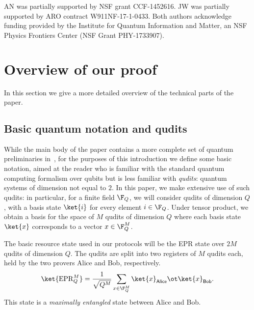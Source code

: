 \documentclass[11pt]{article}
\newcommand{\epr}{\mathrm{EPR}}
\newcommand{\reg}[1]{{\mathsf{#1}}}
\begin{document}
AN was partially supported by NSF grant CCF-1452616.  JW was partially
supported by ARO contract W911NF-17-1-0433. Both authors acknowledge funding provided by the Institute for Quantum Information and Matter, an NSF Physics Frontiers Center (NSF Grant PHY-1733907).




\section{Overview of our proof}  \label{sec:overview}

In this section we give a more detailed overview of the technical
parts of the paper.

\subsection{Basic quantum notation and qudits}
While the main body of the paper contains a more complete set of
quantum preliminaries in~, for the purposes of this
introduction we define some basic notation, aimed at the reader who is
familiar with the standard quantum computing formalism over qubits but
is less familiar with \emph{qudits}: quantum systems of dimension not equal to $2$.
In this paper, we make extensive use of such qudits: in particular, for a finite field $\F_Q$, we will
consider qudits of dimension $Q$, with a basis state $\ket{i}$ for
every element $i \in \F_Q$. Under tensor product, we obtain a basis
for the space of $M$ qudits of dimension $Q$ where each basis state
$\ket{x}$ corresponds to a vector $x \in \F_Q^M$.

The basic resource state used in our protocols will be the EPR state
over $2M$ qudits of dimension $Q$. The qudits are split into two
registers of $M$ qudits each, held by the two provers Alice and Bob,
respectively.
\[ \ket{\epr_Q^M} = \frac{1}{\sqrt{Q^M}} \sum_{x \in \F_Q^M} \ket{x}_{\reg{Alice}}
  \ot \ket{x}_{\reg{Bob}}. \]
This state is a \emph{maximally entangled} state between Alice and
Bob.
\end{document}
